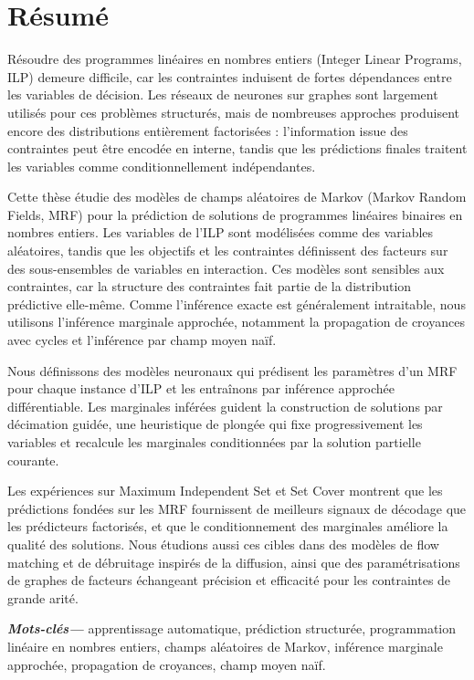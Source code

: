\thesisclearpage

\chapter*{Résumé}

Résoudre des programmes linéaires en nombres entiers (Integer Linear Programs, ILP) demeure difficile, car les contraintes induisent de fortes dépendances entre les variables de décision. Les réseaux de neurones sur graphes sont largement utilisés pour ces problèmes structurés, mais de nombreuses approches produisent encore des distributions entièrement factorisées : l'information issue des contraintes peut être encodée en interne, tandis que les prédictions finales traitent les variables comme conditionnellement indépendantes.

Cette thèse étudie des modèles de champs aléatoires de Markov (Markov Random Fields, MRF) pour la prédiction de solutions de programmes linéaires binaires en nombres entiers. Les variables de l'ILP sont modélisées comme des variables aléatoires, tandis que les objectifs et les contraintes définissent des facteurs sur des sous-ensembles de variables en interaction. Ces modèles sont sensibles aux contraintes, car la structure des contraintes fait partie de la distribution prédictive elle-même. Comme l'inférence exacte est généralement intraitable, nous utilisons l'inférence marginale approchée, notamment la propagation de croyances avec cycles et l'inférence par champ moyen naïf.

Nous définissons des modèles neuronaux qui prédisent les paramètres d'un MRF pour chaque instance d'ILP et les entraînons par inférence approchée différentiable. Les marginales inférées guident la construction de solutions par décimation guidée, une heuristique de plongée qui fixe progressivement les variables et recalcule les marginales conditionnées par la solution partielle courante.

Les expériences sur Maximum Independent Set et Set Cover montrent que les prédictions fondées sur les MRF fournissent de meilleurs signaux de décodage que les prédicteurs factorisés, et que le conditionnement des marginales améliore la qualité des solutions. Nous étudions aussi ces cibles dans des modèles de flow matching et de débruitage inspirés de la diffusion, ainsi que des paramétrisations de graphes de facteurs échangeant précision et efficacité pour les contraintes de grande arité.

\vspace{5pt}
{\noindent \small \textbf{\textit{Mots-clés---}} apprentissage automatique, prédiction structurée, programmation linéaire en nombres entiers, champs aléatoires de Markov, inférence marginale approchée, propagation de croyances, champ moyen naïf.}


